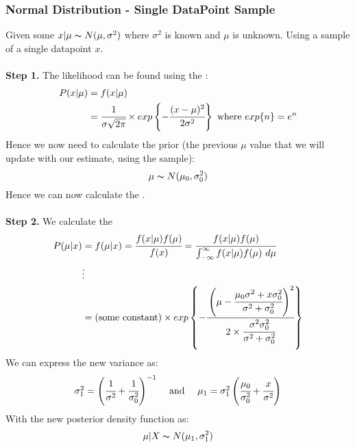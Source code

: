 \documentclass{report}
\begin{document}
\subsubsection*{Normal Distribution - Single DataPoint Sample}
Given some $x|\mu \thicksim N(\mu, \sigma^2)$ where $\sigma^2$ is known and $\mu$ is unknown. Using a sample of a single datapoint $x$.
\\
\\ \textbf{Step 1.} The likelihood can be found using the :
\[\begin{split}
		P(x|\mu) &= f(x|\mu) \\
		&= \cfrac{1}{\sigma \sqrt{2 \pi}} \times exp \left\{ -\cfrac{(x - \mu)^2}{2 \sigma^2} \right\} \text{  where  $exp\{n\} = e^n$}\\
	\end{split}\]
Hence we now need to calculate the prior (the previous $\mu$ value that we will update with our estimate, using the sample):
\[\mu \thicksim N(\mu_0, \sigma^2_0)\]
Hence we can now calculate the .
\\
\\ \textbf{Step 2.} We calculate the 
\[\begin{split}
		P(\mu|x) &= f(\mu|x) = \cfrac{f(x|\mu)f(\mu)}{f(x)} = \cfrac{f(x|\mu)f(\mu)}{\int_{-\infty}^\infty f(x|\mu)f(\mu) \ d \mu} \\
		& \vdots \\
		&= \text{(some constant)} \times exp\left\{ -\cfrac{\left( \mu - \cfrac{\mu_0\sigma^2 + x \sigma_0^2}{\sigma^2 + \sigma_0^2} \right)^2}{2 \times \cfrac{\sigma^2\sigma_0^2}{\sigma^2 + \sigma_0^2}} \right\} \\
	\end{split}\]
We can express the new variance as:
\[\begin{matrix}
		\sigma^2_1 = \left( \cfrac{1}{\sigma^2} + \cfrac{1}{\sigma_0^2} \right)^{-1} & \text{  and  } & \mu_1 = \sigma_1^2 \left( \cfrac{\mu_0}{\sigma_0^2} + \cfrac{x}{\sigma^2} \right) \\
	\end{matrix}\]
With the new posterior density function as:
\[\mu|X \thicksim N(\mu_1, \sigma^2_1)\]
\end{document}
